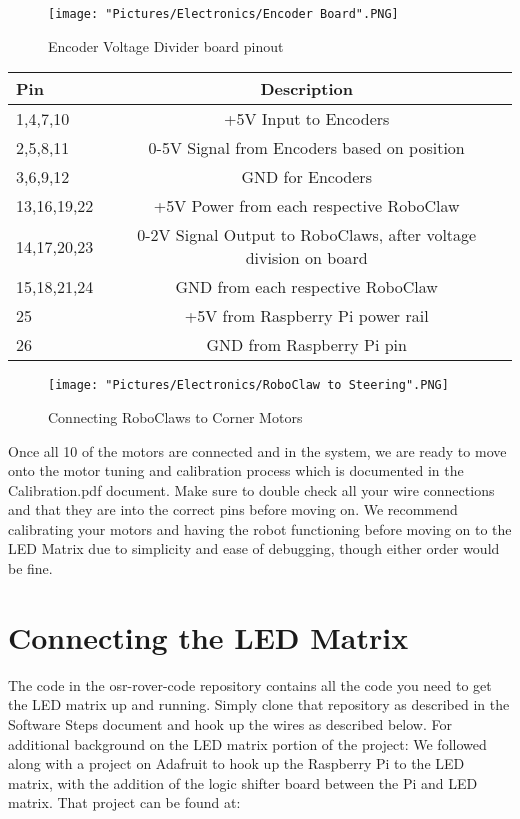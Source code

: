 \documentclass[12pt]{article}
\begin{document}
\begin{figure}[H]
 	\centering
	\texttt{[image: "Pictures/Electronics/Encoder Board".PNG]}
 	\caption{Encoder Voltage Divider board pinout}
	\label{vd pinout}
\end{figure}

\begin{tabular}[2] {| l | c |}
	\hline
	\textbf{Pin} & \textbf{Description} \\ \hline
	1,4,7,10 & +5V Input to Encoders \\ \hline
	2,5,8,11 & 0-5V Signal from Encoders based on position \\ \hline
	3,6,9,12 & GND for Encoders \\ \hline \hline
	13,16,19,22 & +5V Power from each respective RoboClaw \\ \hline
	14,17,20,23 & 0-2V Signal Output to RoboClaws, after voltage division on board \\ \hline
	15,18,21,24 & GND from each respective RoboClaw \\ \hline \hline
	25 & +5V from Raspberry Pi power rail \\ \hline
	26 & GND from Raspberry Pi pin \\ \hline
\end{tabular}

\begin{figure}[H]
 	\centering
	\texttt{[image: "Pictures/Electronics/RoboClaw to Steering".PNG]}
 	\caption{Connecting RoboClaws to Corner Motors}
	\label{RC to Steering}
\end{figure}

Once all 10 of the motors are connected and in the system, we are ready to move onto the motor tuning and calibration process which is documented in the Calibration.pdf document. Make sure to double check all your wire connections and that they are into the correct pins before moving on. We recommend calibrating your motors and having the robot functioning before moving on to the LED Matrix due to simplicity and ease of debugging, though either order would be fine.

\section{Connecting the LED Matrix}
The code in the osr-rover-code repository contains all the code you need to get the LED matrix up and running.  Simply clone that repository as described in the Software Steps document and hook up the wires as described below.  For additional background on the LED matrix portion of the project: We followed along with a project on Adafruit to hook up the Raspberry Pi to the LED matrix, with the addition of the logic shifter board between the Pi and LED matrix. That project can be found at:
\end{document}
